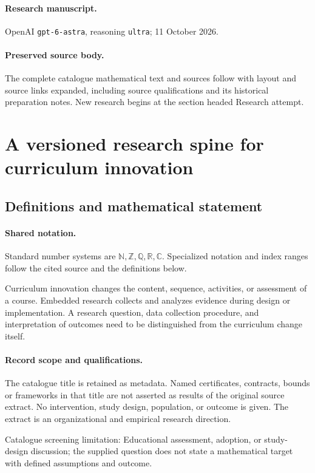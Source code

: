 \documentclass[11pt]{article}
\begin{document}
\paragraph{Research manuscript.} OpenAI \texttt{gpt-6-astra}, reasoning \texttt{ultra}; 11 October 2026.
\paragraph{Preserved source body.} The complete catalogue mathematical text and sources follow with layout and source links expanded, including source qualifications and its historical preparation notes. New research begins at the section headed Research attempt.

\section{A versioned research spine for curriculum innovation}\label{statement}

\subsection{Definitions and mathematical statement}

\paragraph{Shared notation.}Standard number systems are $\mathbb N,\mathbb Z,\mathbb Q,\mathbb R,\mathbb C$. Specialized notation and index ranges follow the cited source and the definitions below.


Curriculum innovation changes the content, sequence, activities, or assessment of a course. Embedded research collects and analyzes evidence during design or implementation. A research question, data collection procedure, and interpretation of outcomes need to be distinguished from the curriculum change itself.
\paragraph{Record scope and qualifications.}
The catalogue title is retained as metadata. Named certificates, contracts, bounds or frameworks in that title are not asserted as results of the original source extract.
No intervention, study design, population, or outcome is given. The extract is an organizational and empirical research direction.

Catalogue screening limitation: Educational assessment, adoption, or study-design discussion; the supplied question does not state a mathematical target with defined assumptions and outcome.
\end{document}
